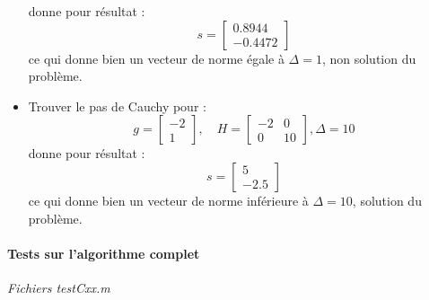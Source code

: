 \documentclass[12pt]{article}	%
\begin{document}
\begin{itemize}
		donne pour résultat :
		\[s = \left[\begin{array}{c}0.8944\\-0.4472\end{array}\right]\]
		ce qui donne bien un vecteur de norme égale à $\Delta = 1$, non solution du problème.
	\item Trouver le pas de Cauchy pour :
		\[g = \left[\begin{array}{c}-2\\1\end{array}\right],\quad H = \left[\begin{array}{cc}-2&0\\0&10\end{array}\right], \Delta = 10\]
		donne pour résultat :
		\[s = \left[\begin{array}{c}5\\-2.5\end{array}\right]\]
		ce qui donne bien un vecteur de norme inférieure à $\Delta = 10$, solution du problème.
\end{itemize}

\paragraph{Tests sur l'algorithme complet}
\begin{flushright}
\textit{Fichiers testCxx.m}
\end{flushright}
\end{document}
